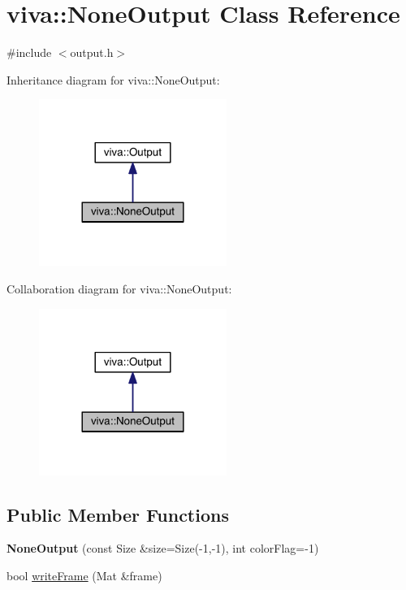 \hypertarget{classviva_1_1_none_output}{}\section{viva\+:\+:None\+Output Class Reference}
\label{classviva_1_1_none_output}


{\ttfamily \#include $<$output.\+h$>$}



Inheritance diagram for viva\+:\+:None\+Output\+:
\nopagebreak
\begin{figure}[H]
\begin{center}
\leavevmode
\includegraphics[width=173pt]{classviva_1_1_none_output__inherit__graph}
\end{center}
\end{figure}


Collaboration diagram for viva\+:\+:None\+Output\+:
\nopagebreak
\begin{figure}[H]
\begin{center}
\leavevmode
\includegraphics[width=173pt]{classviva_1_1_none_output__coll__graph}
\end{center}
\end{figure}
\subsection*{Public Member Functions}
\begin{DoxyCompactItemize}
\item 
{\bfseries None\+Output} (const Size \&size=Size(-\/1,-\/1), int color\+Flag=-\/1)\hypertarget{classviva_1_1_none_output_a71f975278ec4ebc414a9e135ce307bb0}{}\label{classviva_1_1_none_output_a71f975278ec4ebc414a9e135ce307bb0}

\item 
bool \hyperlink{classviva_1_1_none_output_a0f00d1d9c6ca1af279fd566044ef7f60}{write\+Frame} (Mat \&frame)
\end{DoxyCompactItemize}
